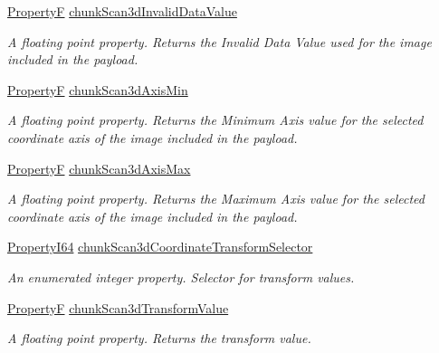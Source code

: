 \begin{DoxyCompactItemize}
\hyperlink{group___common_interface_gaf54865fe5a3d5cfd15f9a111b40d09f9}{Property\+F} \hyperlink{classmv_i_m_p_a_c_t_1_1acquire_1_1_gen_i_cam_1_1_chunk_data_control_a7006c4bc9dee316064885ebe3f6c0ae7}{chunk\+Scan3d\+Invalid\+Data\+Value}
\begin{DoxyCompactList}\small\item\em A floating point property. Returns the Invalid Data Value used for the image included in the payload. \end{DoxyCompactList}\item 
\hyperlink{group___common_interface_gaf54865fe5a3d5cfd15f9a111b40d09f9}{Property\+F} \hyperlink{classmv_i_m_p_a_c_t_1_1acquire_1_1_gen_i_cam_1_1_chunk_data_control_ab3e60dd32a90d506e0ae169d38f0215a}{chunk\+Scan3d\+Axis\+Min}
\begin{DoxyCompactList}\small\item\em A floating point property. Returns the Minimum Axis value for the selected coordinate axis of the image included in the payload. \end{DoxyCompactList}\item 
\hyperlink{group___common_interface_gaf54865fe5a3d5cfd15f9a111b40d09f9}{Property\+F} \hyperlink{classmv_i_m_p_a_c_t_1_1acquire_1_1_gen_i_cam_1_1_chunk_data_control_a5307f0f9c4b623fb7315af85f9f1624c}{chunk\+Scan3d\+Axis\+Max}
\begin{DoxyCompactList}\small\item\em A floating point property. Returns the Maximum Axis value for the selected coordinate axis of the image included in the payload. \end{DoxyCompactList}\item 
\hyperlink{group___common_interface_ga81749b2696755513663492664a18a893}{Property\+I64} \hyperlink{classmv_i_m_p_a_c_t_1_1acquire_1_1_gen_i_cam_1_1_chunk_data_control_a8ab0a44c2daae75c839b3974a1c1cb6b}{chunk\+Scan3d\+Coordinate\+Transform\+Selector}
\begin{DoxyCompactList}\small\item\em An enumerated integer property. Selector for transform values. \end{DoxyCompactList}\item 
\hyperlink{group___common_interface_gaf54865fe5a3d5cfd15f9a111b40d09f9}{Property\+F} \hyperlink{classmv_i_m_p_a_c_t_1_1acquire_1_1_gen_i_cam_1_1_chunk_data_control_a2236122637d64d832aa5ebfaef7c0f29}{chunk\+Scan3d\+Transform\+Value}
\begin{DoxyCompactList}\small\item\em A floating point property. Returns the transform value. \end{DoxyCompactList}\item 

\end{DoxyCompactItemize}
